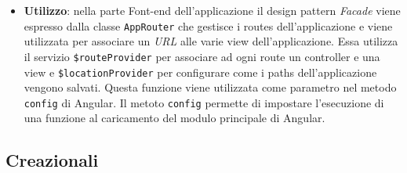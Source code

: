 \begin{itemize}
\item \textbf{Utilizzo}: nella parte Font-end dell'applicazione il design pattern \textit{Facade} viene espresso dalla classe \texttt{AppRouter} che gestisce i routes dell'applicazione e viene utilizzata per associare un \textit{URL} alle varie view dell'applicazione. Essa utilizza il servizio \texttt{\$routeProvider} per associare ad ogni route un controller e una view e \texttt{\$locationProvider} per configurare come i paths dell'applicazione vengono salvati. Questa funzione viene utilizzata come parametro nel metodo \texttt{config} di Angular. Il metoto \texttt{config} permette di impostare l'esecuzione di una funzione al caricamento del modulo principale di Angular.
\end{itemize}

\subsection{Creazionali}
